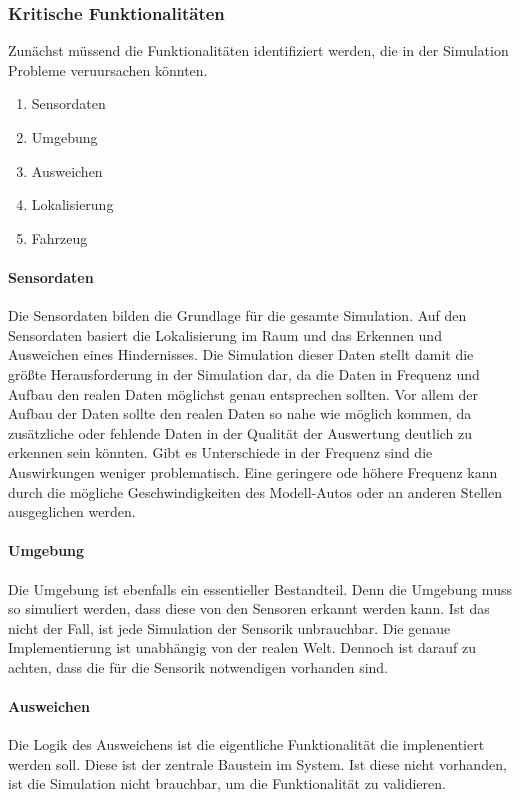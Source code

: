 \subsubsection{Kritische Funktionalitäten}
Zunächst müssend die Funktionalitäten identifiziert werden, die in der Simulation Probleme veruursachen könnten.
\begin{enumerate}
    \item Sensordaten
    \item Umgebung 
    \item Ausweichen
    \item Lokalisierung
    \item Fahrzeug
\end{enumerate}

\paragraph{Sensordaten}
Die Sensordaten bilden die Grundlage für die gesamte Simulation. Auf den Sensordaten basiert die Lokalisierung im Raum und das Erkennen und Ausweichen eines Hindernisses. 
Die Simulation dieser Daten stellt damit die größte Herausforderung in der Simulation dar, da die Daten in Frequenz und Aufbau den realen Daten möglichst genau entsprechen sollten.
Vor allem der Aufbau der Daten sollte den realen Daten so nahe wie möglich kommen, da zusätzliche oder fehlende Daten in der Qualität der Auswertung deutlich zu erkennen sein könnten.
Gibt es Unterschiede in der Frequenz sind die Auswirkungen weniger problematisch. Eine geringere ode höhere Frequenz kann durch die mögliche Geschwindigkeiten des Modell-Autos oder an anderen Stellen ausgeglichen werden.

\paragraph{Umgebung}
Die Umgebung ist ebenfalls ein essentieller Bestandteil. Denn die Umgebung muss so simuliert werden, dass diese von den Sensoren erkannt werden kann. Ist das nicht der Fall, ist jede Simulation der Sensorik unbrauchbar.
Die genaue Implementierung ist unabhängig von der realen Welt. Dennoch ist darauf zu achten, dass die für die Sensorik notwendigen vorhanden sind.

\paragraph{Ausweichen}
Die Logik des Ausweichens ist die eigentliche Funktionalität die implenentiert werden soll. Diese ist der zentrale Baustein im System. 
Ist diese nicht vorhanden, ist die Simulation nicht brauchbar, um die Funktionalität zu validieren.

